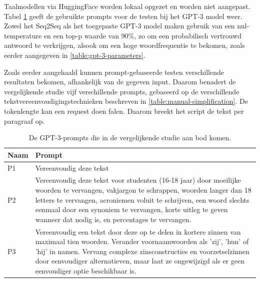 
\medspace

Taalmodellen via HuggingFace worden lokaal opgezet en worden niet aangepast. Tabel \ref{table:tested-prompts} geeft de gebruikte prompts voor de testen bij het GPT-3 model weer. Zowel het Seq2Seq als het toegepaste GPT-3 model maken gebruik van een nul-temperature en een top-p waarde van 90\%, zo om een probabilisch vertrouwd antwoord te verkrijgen, alsook om een hoge woordfrequentie te bekomen, zoals eerder aangegeven in \ref{table:gpt-3-parameters}.



\medspace

Zoals eerder aangehaald kunnen prompt-gebaseerde testen verschillende resultaten bekomen, afhankelijk van de gegeven input. Daarom benadert de vergelijkende studie vijf verschillende prompts, gebaseerd op de verschillende tekstvereenvoudigingstechnieken beschreven in \ref{table:manual-simplification}. De tokenlengte kan een request doen falen. Daarom breekt het script de tekst per paragraaf op.

\begin{center}
	\begin{table}[H]
		\begin{tabular}{ | m{2cm} | m{14cm} | } 
			\hline
			\textbf{Naam} & \textbf{Prompt} \\
			\hline
			P1 & Vereenvoudig deze tekst \\
			\hline
			P2 & Vereenvoudig deze tekst voor studenten (16-18 jaar) door moeilijke woorden te vervangen, vakjargon te schrappen, woorden langer dan 18 letters te vervangen, acroniemen voluit te schrijven, een woord slechts eenmaal door een synoniem te vervangen, korte uitleg te geven wanneer dat nodig is, en percentages te vervangen. \\
			\hline
			P3 & Vereenvoudig een tekst door deze op te delen in kortere zinnen van maximaal tien woorden. Verander voornaamwoorden als 'zij', 'hun' of 'hij' in namen. Vervang complexe zinsconstructies en voorzetselzinnen door eenvoudiger alternatieven, maar laat ze ongewijzigd als er geen eenvoudiger optie beschikbaar is. \\
			\hline
		\end{tabular}
		\label{table:tested-prompts}
		\caption{De GPT-3-prompts die in de vergelijkende studie aan bod komen.}
	\end{table}
\end{center}


